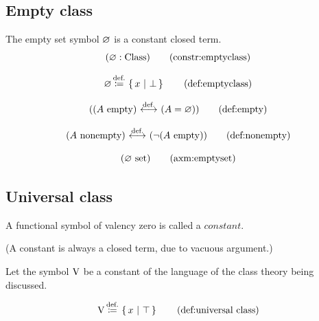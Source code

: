 \subsection{Empty class}

\begin{constructor}%
The empty set symbol $\varnothing$ is a constant closed term.
\[
(\emptyclass : \Class)
\labeltagd{constr}{emptyclass}
\]
\end{constructor}

\begin{definition}
\[
\emptyclass \eqdef \cc{x}{\bot}
\labeltagd{def}{emptyclass}
\]
\end{definition}

\begin{definition}
\[
((A\isempty)\iffdef(A=\emptyclass))
\labeltagd{def}{empty}
\]
\end{definition}

\begin{definition}
\[
(A\nonempty)
\iffdef
(\neg(A\isempty))
\labeltagd{def}{nonempty}
\]
\end{definition}



\begin{axiom}
\[
(\emptyclass\set)
\labeltagd{axm}{emptyset}
\]
\end{axiom}

\subsection{Universal class}
\begin{metadefinition}[constant]
A functional symbol of valency zero is called a $constant$.
\end{metadefinition}
(A constant is always a closed term, due to vacuous argument.)
\begin{constructor}%
Let the symbol $\mathrm{V}$ be a constant of the language of the class theory being discussed.
\end{constructor}

\begin{definition}
\[
\V\eqdef\cc{x}{\top}
\clabeltagd{def}{universal class}
\]
\end{definition}

